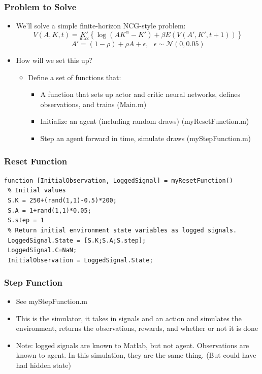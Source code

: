 \documentclass{beamer}
\begin{document}
\begin{frame}
\frametitle[alignment=center]{Problem to Solve}
\begin{itemize}
\item We'll solve a simple finite-horizon NCG-style problem:
$$V(A,K,t)=\underset{\max}{K'}\left\{\log(A K^{\alpha}-K')+\beta E(V(A',K',t+1))\right\}$$
$$A'=(1-\rho)+\rho A+\epsilon,\ \ \ \epsilon\sim\mathcal{N}(0,0.05)$$
\item How will we set this up?
\begin{itemize}
\item Define a set of functions that:
\begin{itemize}
\item A function that sets up actor and critic neural networks, defines observations, and trains (Main.m)
\item Initialize an agent (including random draws) (myResetFunction.m)
\item Step an agent forward in time, simulate draws (myStepFunction.m)
\end{itemize}
\end{itemize}
\end{itemize}
\end{frame}


\begin{frame}
\frametitle[alignment=center]{Reset Function}
\texttt{function [InitialObservation, LoggedSignal] = myResetFunction()}\\
\texttt{ \% Initial values}\\
\texttt{    S.K = 250+(rand(1,1)-0.5)*200;}\\
 \texttt{   S.A = 1+rand(1,1)*0.05;}\\
\texttt{    S.step = 1}   \\
 \texttt{  \% Return initial environment state variables as logged signals.}\\
\texttt{    LoggedSignal.State = [S.K;S.A;S.step];}\\
\texttt{    LoggedSignal.C=NaN;}\\
\texttt{    InitialObservation = LoggedSignal.State;}
\end{frame}

\begin{frame}
\frametitle[alignment=center]{Step Function}
\begin{itemize}
\item See myStepFunction.m
\bigskip
\item This is the simulator, it takes in signals and an action and simulates the environment, returns the observations, rewards, and whether or not it is done
\bigskip
\item Note:  logged signals are known to Matlab, but not agent.  Observations are known to agent.  In this simulation, they are the same thing.  (But could have had hidden state)
\end{itemize}
\end{frame}
\end{document}
